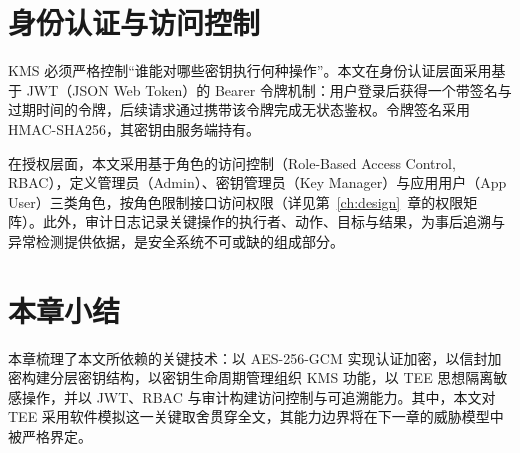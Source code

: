 \section{身份认证与访问控制}
\label{sec:authz}

KMS 必须严格控制“谁能对哪些密钥执行何种操作”。本文在身份认证层面采用基于 JWT（JSON Web Token）的 Bearer 令牌机制\cite{rfc7519}：用户登录后获得一个带签名与过期时间的令牌，后续请求通过携带该令牌完成无状态鉴权。令牌签名采用 HMAC-SHA256\cite{rfc2104, fips180}，其密钥由服务端持有。

在授权层面，本文采用基于角色的访问控制（Role-Based Access Control, RBAC），定义管理员（Admin）、密钥管理员（Key Manager）与应用用户（App User）三类角色，按角色限制接口访问权限（详见第~\ref{ch:design}~章的权限矩阵）。此外，审计日志记录关键操作的执行者、动作、目标与结果，为事后追溯与异常检测提供依据，是安全系统不可或缺的组成部分。

\section{本章小结}

本章梳理了本文所依赖的关键技术：以 AES-256-GCM 实现认证加密，以信封加密构建分层密钥结构，以密钥生命周期管理组织 KMS 功能，以 TEE 思想隔离敏感操作，并以 JWT、RBAC 与审计构建访问控制与可追溯能力。其中，本文对 TEE 采用软件模拟这一关键取舍贯穿全文，其能力边界将在下一章的威胁模型中被严格界定。
